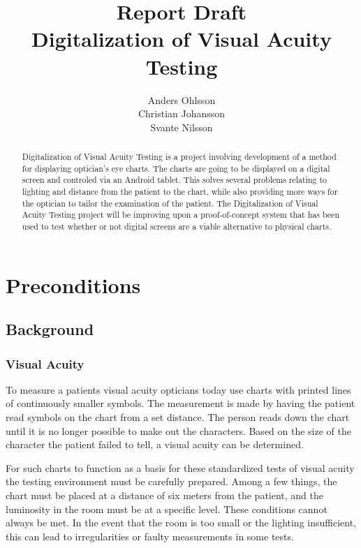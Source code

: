 \documentclass[12pt,a4paper,notitlepage]{report}
\begin{document}
\title{Report Draft\\Digitalization of Visual Acuity Testing}
\author{Anders Ohlsson\\Christian Johansson\\Svante Nilsson}
\maketitle

\begin{abstract}
Digitalization of Visual Acuity Testing is a project involving development of a method for displaying optician's eye charts. The charts are going to be displayed on a digital screen and controled via an Android tablet. This solves several problems relating to lighting and distance from the patient to the chart, while also providing more ways for the optician to tailor the examination of the patient. The Digitalization of Visual Acuity Testing project will be improving upon a proof-of-concept system that has been used to test whether or not digital screens are a viable alternative to physical charts.
\end{abstract}
\thispagestyle{empty}
\clearpage

\tableofcontents
\thispagestyle{empty}
\clearpage

\setcounter{page}{1}
\chapter{Preconditions}
\section{Background}
\subsection{Visual Acuity}
To measure a patients visual acuity opticians today use charts with printed lines of continuously smaller symbols. The measurement is made by having the patient read symbols on the chart from a set distance. The person reads down the chart until it is no longer possible to make out the characters. Based on the size of the character the patient failed to tell, a visual acuity can be determined. 

For such charts to function as a basis for these standardized tests of visual acuity the testing environment must be carefully prepared. Among a few things, the chart must be placed at a distance of six meters from the patient, and the luminosity in the room must be at a specific level. These conditions cannot always be met. In the event that the room is too small or the lighting insufficient, this can lead to irregularities or faulty measurements in some tests. 
\end{document}
